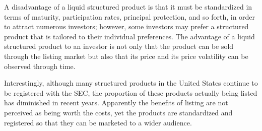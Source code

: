 \documentclass[11pt]{article}
\begin{document}
A disadvantage of a liquid structured product is that it must be standardized in terms of maturity, participation rates, principal protection, and so forth, in order to attract numerous investors; however, some investors may prefer a structured product that is tailored to their individual preferences. The advantage of a liquid structured product to an investor is not only that the product can be sold through the listing market but also that its price and its price volatility can be observed through time.

Interestingly, although many structured products in the United States continue to be registered with the SEC, the proportion of these products actually being listed has diminished in recent years. Apparently the benefits of listing are not perceived as being worth the costs, yet the products are standardized and registered so that they can be marketed to a wider audience.
\end{document}

